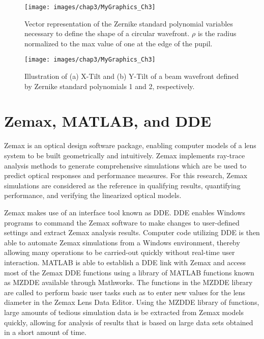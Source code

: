 \begin{figure}[htb]		%
\centering
\texttt{[image: images/chap3/MyGraphics\_Ch3]}
\caption{Vector representation of the Zernike standard polynomial variables necessary to define the shape of a circular wavefront. $\rho$ is the radius normalized to the max value of one at the edge of the pupil.}
\label{fig:zernCircle}
\end{figure}

\begin{figure}[htb]		%
\centering
\texttt{[image: images/chap3/MyGraphics\_Ch3]}
\caption{Illustration of (a) X-Tilt and (b) Y-Tilt of a beam wavefront defined by Zernike standard polynomials 1 and 2, respectively.}
\label{fig:zernTilts}
\end{figure}

\section{Zemax, MATLAB, and DDE}
Zemax is an optical design software package, enabling computer models of a lens system to be built geometrically and intuitively. Zemax implements ray-trace analysis methods to generate comprehensive simulations which are be used to predict optical responses and performance measures. For this research, Zemax simulations are considered as the reference in qualifying results, quantifying performance, and verifying the linearized optical models.

Zemax makes use of an interface tool known as \ac{DDE}. \ac{DDE} enables Windows programs to command the Zemax software to make changes to user-defined settings and extract Zemax analysis results. Computer code utilizing DDE is then able to automate Zemax simulations from a Windows environment, thereby allowing many operations to be carried-out quickly without real-time user interaction. MATLAB is able to establish a \ac{DDE} link with Zemax and access most of the Zemax DDE functions using a library of MATLAB functions known as MZDDE available through Mathworks. The functions in the MZDDE library are called to perform basic user tasks such as to enter new values for the lens diameter in the Zemax Lens Data Editor. Using the MZDDE library of functions, large amounts of tedious simulation data is be extracted from Zemax models quickly, allowing for analysis of results that is based on large data sets obtained in a short amount of time.

